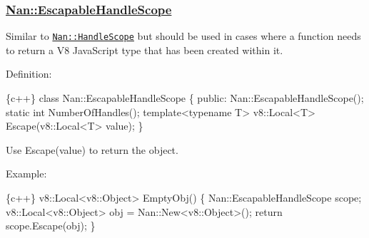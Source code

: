 \label{_api_nan_escapable_handle_scope}%
 \subsubsection*{\hyperlink{class_nan_1_1_escapable_handle_scope}{Nan\+::\+Escapable\+Handle\+Scope}}

Similar to \href{#api_nan_handle_scope}{\tt {\ttfamily Nan\+::\+Handle\+Scope}} but should be used in cases where a function needs to return a V8 Java\+Script type that has been created within it.

Definition\+:


\begin{DoxyCode}
\{c++\}
class Nan::EscapableHandleScope \{
 public:
  Nan::EscapableHandleScope();
  static int NumberOfHandles();
  template<typename T> v8::Local<T> Escape(v8::Local<T> value);
\}
\end{DoxyCode}


Use {\ttfamily Escape(value)} to return the object.

Example\+:


\begin{DoxyCode}
\{c++\}
v8::Local<v8::Object> EmptyObj() \{
  Nan::EscapableHandleScope scope;
  v8::Local<v8::Object> obj = Nan::New<v8::Object>();
  return scope.Escape(obj);
\}
\end{DoxyCode}
 